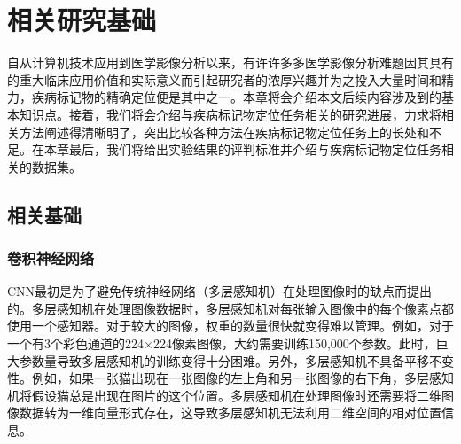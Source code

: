 \chapter{相关研究基础}
自从计算机技术应用到医学影像分析以来，有许许多多医学影像分析难题因其具有的重大临床应用价值和实际意义而引起研究者的浓厚兴趣并为之投入大量时间和精力，疾病标记物的精确定位便是其中之一。本章将会介绍本文后续内容涉及到的基本知识点。接着，我们将会介绍与疾病标记物定位任务相关的研究进展，力求将相关方法阐述得清晰明了，突出比较各种方法在疾病标记物定位任务上的长处和不足。在本章最后，我们将给出实验结果的评判标准并介绍与疾病标记物定位任务相关的数据集。
\section{相关基础}
\subsection{卷积神经网络}\label{subsec:cnn_introduction}
CNN最初是为了避免传统神经网络（多层感知机）在处理图像时的缺点而提出的。多层感知机在处理图像数据时，多层感知机对每张输入图像中的每个像素点都使用一个感知器。对于较大的图像，权重的数量很快就变得难以管理。例如，对于一个有3个彩色通道的224$\times$224像素图像，大约需要训练150,000个参数。此时，巨大参数量导致多层感知机的训练变得十分困难。另外，多层感知机不具备平移不变性。例如，如果一张猫出现在一张图像的左上角和另一张图像的右下角，多层感知机将假设猫总是出现在图片的这个位置。多层感知机在处理图像时还需要将二维图像数据转为一维向量形式存在，这导致多层感知机无法利用二维空间的相对位置信息。

